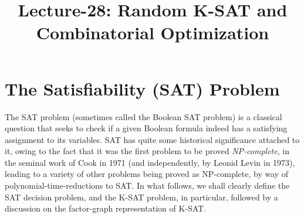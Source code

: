 \documentclass[letterpaper,english,11pt]{article}
\title{Lecture-28: Random K-SAT and Combinatorial Optimization}
\begin{document}
\maketitle
\section{The Satisfiability (SAT) Problem}

The SAT problem (sometimes called the Boolean SAT problem) is a classical question that seeks to check if a given Boolean formula indeed has a satisfying assignment to its variables. SAT has quite some historical significance attached to it, owing to the fact that it was the first problem to be proved \textit{NP-complete}, in the seminal work of Cook in 1971 (and independently, by Leonid Levin in 1973), leading to a variety of other problems being proved as NP-complete, by way of polynomial-time-reductions to SAT. In what follows, we shall clearly define the SAT decision problem, and the K-SAT problem, in particular, followed by a discussion on the factor-graph representation of K-SAT.\\
\end{document}
